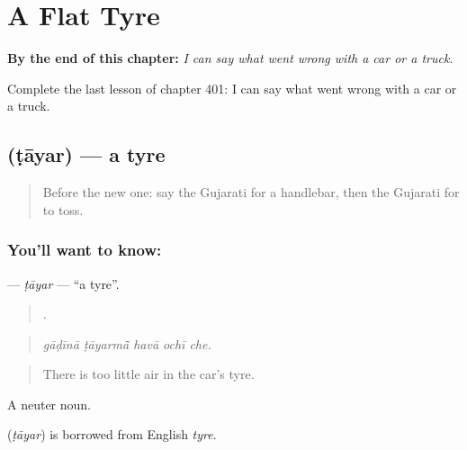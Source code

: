 
\chapter{A Flat Tyre}
\label{ch:gu-a-flat-tyre}

\begin{chapteropening}
\textbf{By the end of this chapter:} \emph{I can say what went wrong with a car or a truck.}

Complete the last lesson of chapter 401: I can say what went wrong with a car or a truck.
\end{chapteropening}

\section[\texorpdfstring{\gu{ટાયર} (ṭāyar)}{ટાયર (ṭāyar)}]{ (ṭāyar) — a tyre}

\label{lesson:GU-C401-tayar}



\begin{quote}
Before the new one: say the Gujarati for a handlebar, then the Gujarati for to toss.
\end{quote}

\subsection*{You'll want to know: }
\textbf{} — \emph{ṭāyar} — \textquotedblleft{}a tyre\textquotedblright{}.

\begin{quote}
    .
\end{quote}

\begin{quote}
\emph{gāḍīnā ṭāyarmā̃ havā ochī che.}
\end{quote}

\begin{quote}
There is too little air in the car's tyre.
\end{quote}

A neuter noun.

\begin{cousinweb}
\textbf{} (\emph{ṭāyar}) is borrowed from English \emph{tyre}.
\end{cousinweb}

